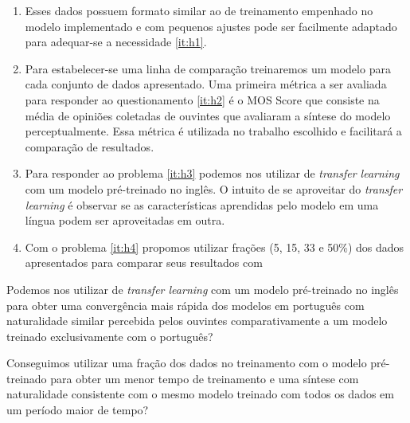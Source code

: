 \documentclass{article}
\begin{document}
\begin{enumerate}
	\item Esses dados possuem formato similar ao de treinamento empenhado no modelo implementado e com pequenos ajustes pode ser facilmente adaptado para adequar-se a necessidade \ref{it:h1}.
	\item Para estabelecer-se uma linha de comparação treinaremos um modelo para cada conjunto de dados apresentado.
	Uma primeira métrica a ser avaliada para responder ao questionamento \ref{it:h2} é o MOS Score que consiste na média de opiniões coletadas de ouvintes que avaliaram a síntese do modelo perceptualmente.
	Essa métrica é utilizada no trabalho escolhido e facilitará a comparação de resultados.
	\item Para responder ao problema \ref{it:h3} podemos nos utilizar de \textit{transfer learning} com um modelo pré-treinado no inglês.
	O intuito de se aproveitar do \textit{transfer learning} é observar se as características aprendidas pelo modelo em uma língua podem ser aproveitadas em outra.
	\item Com o problema \ref{it:h4} propomos utilizar frações (5, 15, 33 e 50\%) dos dados apresentados para comparar seus resultados com
\end{enumerate}




Podemos nos utilizar de \textit{transfer learning} com um modelo pré-treinado no inglês para obter uma convergência mais rápida dos modelos em português com naturalidade similar percebida pelos ouvintes comparativamente a um modelo treinado exclusivamente com o português?

Conseguimos utilizar uma fração dos dados no treinamento com o modelo pré-treinado para obter um menor tempo de treinamento e uma síntese com naturalidade consistente com o mesmo modelo treinado com todos os dados em um período maior de tempo?
\end{document}

